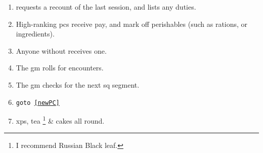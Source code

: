 
\begin{enumerate}
  \item
   requests a recount of the last session, and lists any duties.
  \item
  High-ranking \Glspl{pc} receive pay, and mark off perishables (such as rations, or \glspl{ingredient}).
  \item
  Anyone without  receives one.
  \label{newPC}
  \item
  The \gls{gm} rolls for encounters.
  \label{gmRollsEncounters}
  \item
  The \gls{gm} checks for the next \gls{sq} \gls{segment}.
  \item
  {\tt goto \ref{newPC}}
  \item
  \Glspl{xp}, tea%
  \ifodd\value{r3}\footnote{I recommend Russian Black leaf.}\fi
  \& cakes all round.
\end{enumerate}

